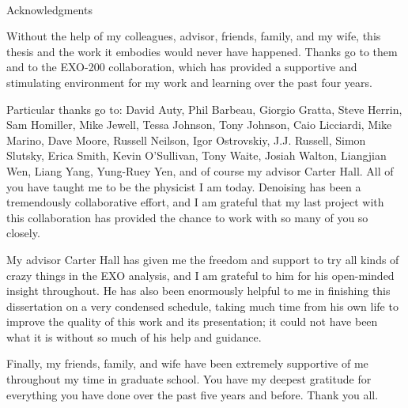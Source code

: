 
\renewcommand{\baselinestretch}{2}
\small\normalsize
\hbox{\ }
 
\vspace{-.65in}

\begin{center}
\large{Acknowledgments} 
\end{center} 

\vspace{1ex}

Without the help of my colleagues, advisor, friends, family, and my wife, this thesis and the work it embodies would never have happened.  Thanks go to them and to the EXO-200 collaboration, which has provided a supportive and stimulating environment for my work and learning over the past four years.

Particular thanks go to: David Auty, Phil Barbeau, Giorgio Gratta, Steve Herrin, Sam Homiller, Mike Jewell, Tessa Johnson, Tony Johnson, Caio Licciardi, Mike Marino, Dave Moore, Russell Neilson, Igor Ostrovskiy, J.J. Russell, Simon Slutsky, Erica Smith, Kevin O'Sullivan, Tony Waite, Josiah Walton, Liangjian Wen, Liang Yang, Yung-Ruey Yen, and of course my advisor Carter Hall.  All of you have taught me to be the physicist I am today.  Denoising has been a tremendously collaborative effort, and I am grateful that my last project with this collaboration has provided the chance to work with so many of you so closely.

My advisor Carter Hall has given me the freedom and support to try all kinds of crazy things in the EXO analysis, and I am grateful to him for his open-minded insight throughout.  He has also been enormously helpful to me in finishing this dissertation on a very condensed schedule, taking much time from his own life to improve the quality of this work and its presentation; it could not have been what it is without so much of his help and guidance.

Finally, my friends, family, and wife have been extremely supportive of me throughout my time in graduate school.  You have my deepest gratitude for everything you have done over the past five years and before.  Thank you all.




